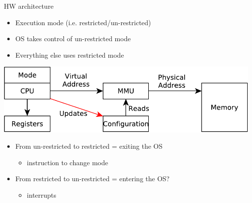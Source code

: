 \documentclass{beamer}
\begin{document}
\begin{frame}{HW architecture}
  \begin{itemize}
  \item Execution mode (i.e. restricted/un-restricted)
  \item OS takes control of un-restricted mode
  \item Everything else uses restricted mode
  \end{itemize}
  \begin{center}
  \includegraphics[width=0.6\linewidth]{mode0}
  \end{center}
  \begin{itemize}
  \item<2-> From un-restricted to restricted = exiting the OS
  \begin{itemize}
    \item instruction to change mode
  \end{itemize}
  \item<3-> From restricted to un-restricted = entering the OS?
  \begin{itemize}
    \item<4-> interrupts
  \end{itemize}
  \end{itemize}
\end{frame}
\end{document}
